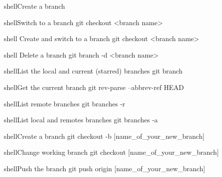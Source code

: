 \documentclass[10pt,a4paper]{article}
\begin{document}
\begin{multicols}{3}
\begin{codebox}{shell}{Create a branch}
\end{codebox}

\begin{codebox}{shell}{Switch to a branch}
git checkout <branch name>

\end{codebox}

\begin{codebox}{shell}{}
Create and switch to a branch
git checkout <branch name>

\end{codebox}

\begin{codebox}{shell}{}
Delete a branch
git branch -d <branch name>

\end{codebox}

\begin{codebox}{shell}{List the local and current (starred) branches}
git branch

\end{codebox}

\begin{codebox}{shell}{Get the current branch}
git rev-parse --abbrev-ref HEAD

\end{codebox}

\begin{codebox}{shell}{List remote branches}
git branches -r

\end{codebox}

\begin{codebox}{shell}{List local and remotes branches}
git branches -a

\end{codebox}

\begin{codebox}{shell}{Create a branch}
git checkout -b [name_of_your_new_branch]

\end{codebox}

\begin{codebox}{shell}{Change working branch}
git checkout [name_of_your_new_branch]

\end{codebox}

\begin{codebox}{shell}{Push the branch}
git push origin [name_of_your_new_branch]

\end{codebox}


\end{multicols}
\end{document}
